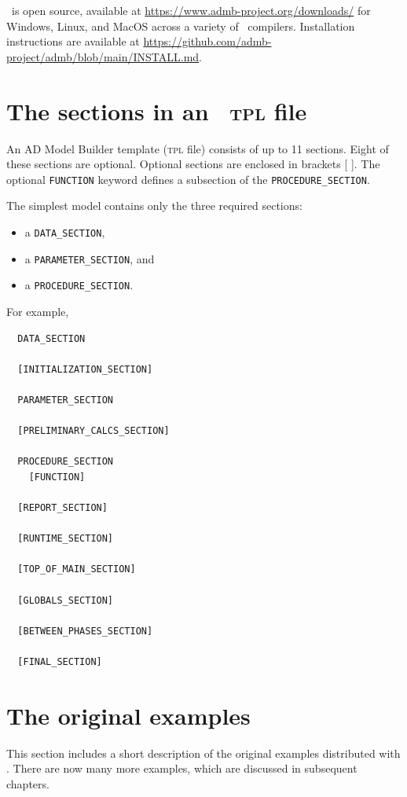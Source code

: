 \documentclass{admbmanual}
\newcommand\DS{\texttt{DATA\_SECTION}}
\newcommand\PS{\texttt{PARAMETER\_SECTION}}
\newcommand\PROS{\texttt{PROCEDURE\_SECTION}}
\begin{document}
\ADM\ is open source, available at \url{https://www.admb-project.org/downloads/}
for Windows, Linux, and MacOS across a variety of \cplus\ compilers.
Installation instructions are available at
\url{https://github.com/admb-project/admb/blob/main/INSTALL.md}.

\section{The sections in an \ADMS\ \textsc{tpl} file}

An AD Model Builder template (\textsc{tpl} file) consists of up to 11 sections.
Eight of these sections are optional. Optional sections are
enclosed in brackets [ ]. The optional \texttt{FUNCTION} keyword defines a
subsection of the \PROS.

The simplest model contains only the three required sections:
\begin{itemize}
  \item a \DS,
  \item a \PS, and
  \item a \PROS.
\end{itemize}

For example,
\begin{lstlisting}
  DATA_SECTION

  [INITIALIZATION_SECTION]

  PARAMETER_SECTION

  [PRELIMINARY_CALCS_SECTION]

  PROCEDURE_SECTION
    [FUNCTION]

  [REPORT_SECTION]

  [RUNTIME_SECTION]

  [TOP_OF_MAIN_SECTION]

  [GLOBALS_SECTION]

  [BETWEEN_PHASES_SECTION]

  [FINAL_SECTION]
\end{lstlisting}

\section{The original \ADMS examples}

This section includes a short description of the original examples distributed
with \ADM. There are now many more examples, which are discussed in subsequent
chapters.

\end{document}
